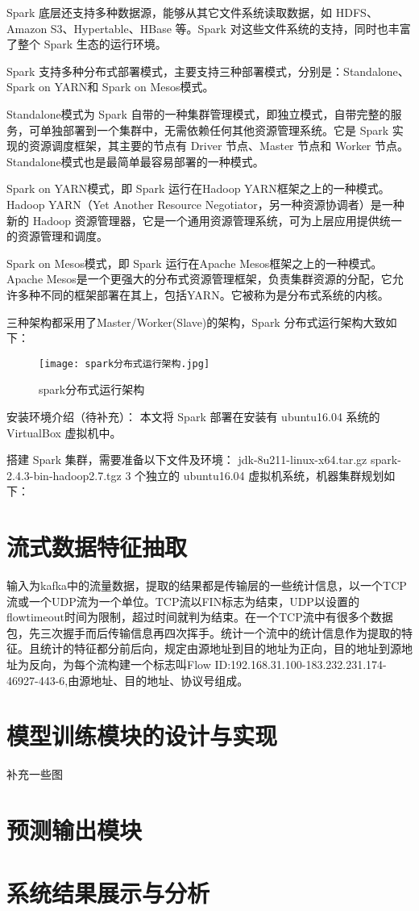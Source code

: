 Spark 底层还支持多种数据源，能够从其它文件系统读取数据，如 HDFS、Amazon S3、Hypertable、HBase 等。Spark 对这些文件系统的支持，同时也丰富了整个 Spark 生态的运行环境。

Spark 支持多种分布式部署模式，主要支持三种部署模式，分别是：Standalone、Spark on YARN和 Spark on Mesos模式。

Standalone模式为 Spark 自带的一种集群管理模式，即独立模式，自带完整的服务，可单独部署到一个集群中，无需依赖任何其他资源管理系统。它是 Spark 实现的资源调度框架，其主要的节点有 Driver 节点、Master 节点和 Worker 节点。Standalone模式也是最简单最容易部署的一种模式。

Spark on YARN模式，即 Spark 运行在Hadoop YARN框架之上的一种模式。Hadoop YARN（Yet Another Resource
Negotiator，另一种资源协调者）是一种新的 Hadoop 资源管理器，它是一个通用资源管理系统，可为上层应用提供统一的资源管理和调度。

Spark on Mesos模式，即 Spark 运行在Apache Mesos框架之上的一种模式。Apache Mesos是一个更强大的分布式资源管理框架，负责集群资源的分配，它允许多种不同的框架部署在其上，包括YARN。它被称为是分布式系统的内核。

三种架构都采用了Master/Worker(Slave)的架构，Spark 分布式运行架构大致如下：
\begin{figure}
    \centering
    \texttt{[image: spark分布式运行架构.jpg]}
    \caption{spark分布式运行架构}
    \label{fig:spark}
  \end{figure}


安装环境介绍（待补充）：
本文将 Spark 部署在安装有 ubuntu16.04 系统的 VirtualBox 虚拟机中。

搭建 Spark 集群，需要准备以下文件及环境：
jdk-8u211-linux-x64.tar.gz
spark-2.4.3-bin-hadoop2.7.tgz
3 个独立的 ubuntu16.04 虚拟机系统，机器集群规划如下：



\section{流式数据特征抽取}
输入为kafka中的流量数据，提取的结果都是传输层的一些统计信息，以一个TCP流或一个UDP流为一个单位。TCP流以FIN标志为结束，UDP以设置的flowtimeout时间为限制，超过时间就判为结束。在一个TCP流中有很多个数据包，先三次握手而后传输信息再四次挥手。统计一个流中的统计信息作为提取的特征。且统计的特征都分前后向，规定由源地址到目的地址为正向，目的地址到源地址为反向，为每个流构建一个标志叫Flow ID:192.168.31.100-183.232.231.174-46927-443-6,由源地址、目的地址、协议号组成。
\section{模型训练模块的设计与实现}
补充一些图
\section{预测输出模块}
\section{系统结果展示与分析}

